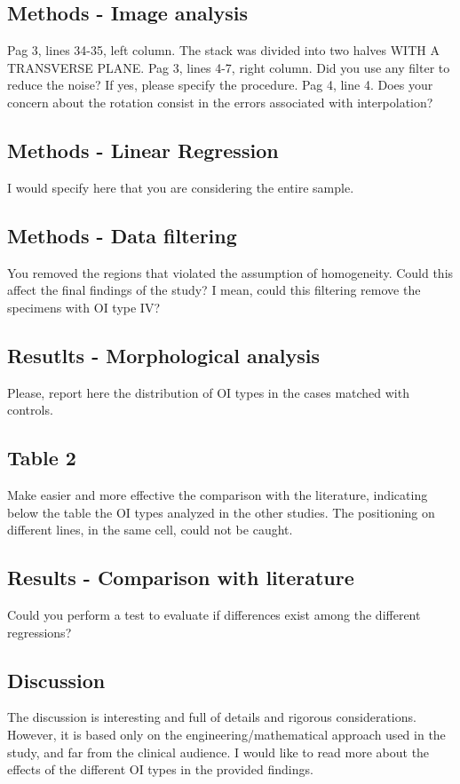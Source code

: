 \documentclass{AR2RC}
\begin{document}
\subsection{Methods - Image analysis}
Pag 3, lines 34-35, left column. The stack was divided into two halves WITH A TRANSVERSE PLANE. Pag 3, lines 4-7, right column. Did you use any filter to reduce the noise? If yes, please specify the procedure. Pag 4, line 4. Does your concern about the rotation consist in the errors associated with interpolation?

\subsection{Methods - Linear Regression}
I would specify here that you are considering the entire sample.

\subsection{Methods - Data filtering}
You removed the regions that violated the assumption of homogeneity. Could this affect the final findings of the study? I mean, could this filtering remove the specimens with OI type IV?

\subsection{Resutlts - Morphological analysis}
Please, report here the distribution of OI types in the cases matched with controls.

\subsection{Table 2}
Make easier and more effective the comparison with the literature, indicating below the table the OI types analyzed in the other studies. The positioning on different lines, in the same cell, could not be caught.

\subsection{Results - Comparison with literature}
Could you perform a test to evaluate if differences exist among the different regressions?

\subsection{Discussion}
The discussion is interesting and full of details and rigorous considerations. However, it is based only on the engineering/mathematical approach used in the study, and far from the clinical audience. I would like to read more about the effects of the different OI types in the provided findings.
\end{document}

